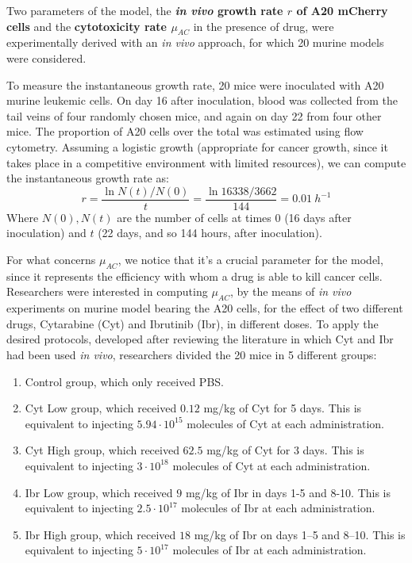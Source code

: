 Two parameters of the model, the \textbf{\textit{in vivo} growth rate $r$ of A20 mCherry cells} and the \textbf{cytotoxicity rate $\mu_{AC}$} in the presence of drug, were experimentally derived with an \textit{in vivo} approach, for which 20 murine models were considered. \par
\vspace{0.4cm}
To measure the instantaneous growth rate, 20 mice were inoculated with A20 murine leukemic cells. On day 16 after inoculation, blood was collected from the tail veins of four randomly chosen mice, and again on day 22 from four other mice. The proportion of A20 cells over the total was estimated using flow cytometry. Assuming a logistic growth (appropriate for cancer growth, since it takes place in a competitive environment with limited resources), we can compute the instantaneous growth rate as: 
\[ r = \frac{\ln{N(t)/N(0)}}{t} = \frac{\ln{16338/3662}}{144} = 0.01\ h^{-1} \]
Where $N(0), N(t)$ are the number of cells at times $0$ (16 days after inoculation) and $t$ (22 days, and so 144 hours, after inoculation).\\ \par
\vspace{0.4cm}
For what concerns $\mu_{AC}$, we notice that it's a crucial parameter for the model, since it represents the efficiency with whom a drug is able to kill cancer cells. Researchers were interested in computing $\mu_{AC}$, by the means of \textit{in vivo} experiments on murine model bearing the A20 cells, for the effect of two different drugs, Cytarabine (Cyt) and Ibrutinib (Ibr), in different doses. To apply the desired protocols, developed after reviewing the literature in which Cyt and Ibr had been used \textit{in vivo}, researchers divided the 20 mice in 5 different groups:\begin{enumerate}
	\item Control group, which only received PBS.
	\item Cyt Low group, which received $0.12$ mg/kg of Cyt for 5 days. This is equivalent to injecting $5.94 \cdot 10^{15}$ molecules of Cyt at each
	administration. 
	\item Cyt High group, which received $62.5$ mg/kg of Cyt for 3 days. This is equivalent to injecting $3 \cdot 10^{18}$ molecules of Cyt at each
	administration. 
	\item Ibr Low group, which received $9$ mg/kg of Ibr in days 1-5 and 8-10. This is equivalent to injecting $2.5 \cdot 10^{17}$ molecules of Ibr at 
	each administration. 
	\item Ibr High group, which received $18$ mg/kg of Ibr on days 1–5 and 8–10. This is equivalent to injecting $5 \cdot 10^{17}$ molecules of Ibr at 
	each administration. 
\end{enumerate}
